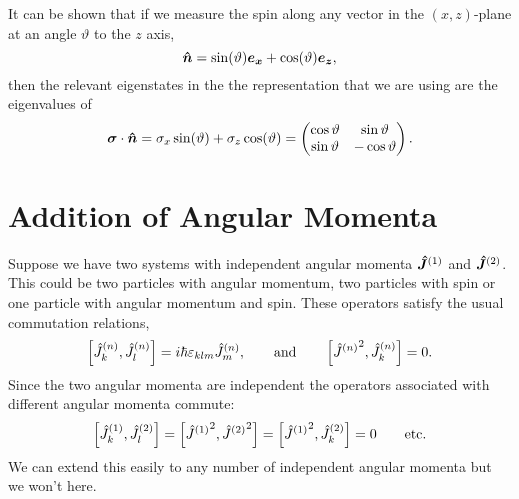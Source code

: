 It can be shown that if we measure the spin along any vector in the \((x, z)\)-plane at an angle \(\vartheta\) to the \(z\) axis,
\[\bm{\hat{n}} = \sin(\vartheta)\bm{e_{x}} + \cos(\vartheta)\bm{e_{z}},\]
then the relevant eigenstates in the the representation that we are using are the eigenvalues of
\[
\bm{\sigma}\cdot\bm{\hat{n}} = \sigma_x\sin(\vartheta) + \sigma_z\cos(\vartheta) = 
\begin{pmatrix}
    \cos\vartheta & \sin\vartheta\\
    \sin\vartheta & -\cos\vartheta
\end{pmatrix}
.
\]

\section{Addition of Angular Momenta}\label{sec:addition of angular momenta}
Suppose we have two systems with independent angular momenta \(\bm{\hat{J}}^{(1)}\) and \(\bm{\hat{J}}^{(2)}\).
This could be two particles with angular momentum, two particles with spin or one particle with angular momentum and spin.
These operators satisfy the usual commutation relations,
\[\left[\operator{J}^{(n)}_k, \operator{J}^{(n)}_l\right] = i\hbar\varepsilon_{klm}\operator{J}^{(n)}_m, \qquad\text{and}\qquad \left[\angmomsquared{n}, \operator{J}^{(n)}_k\right] = 0.\]
Since the two angular momenta are independent the operators associated with different angular momenta commute:
\[\left[\operator{J}^{(1)}_k, \operator{J}^{(2)}_l\right] = \left[\angmomsquared{1}, \angmomsquared{2}\right] = \left[\angmomsquared{1}, \operator{J}^{(2)}_k\right] = 0 \qquad\text{etc.}\]
We can extend this easily to any number of independent angular momenta but we won't here.

